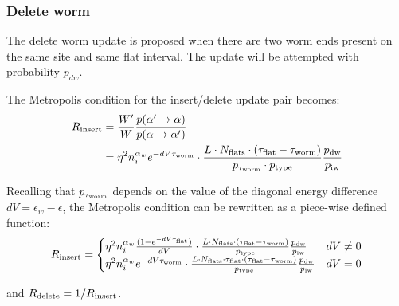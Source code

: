 \documentclass[12pt, two sided]{article}
\begin{document}
    
    \subsubsection{Delete worm}
    The delete worm update is proposed when there are two worm ends present on the same site and same flat interval. The update will be attempted with probability $p_{dw}$.
    
    The Metropolis condition for the insert/delete update pair becomes:
    \begin{align}
    R_{\rm{insert}} &= \frac{W^\prime }{W } \frac{p(\alpha^\prime \to \alpha)}{p(\alpha \to \alpha^\prime)} \nonumber \\
    &= \eta^2 n_i^{\alpha_w} e^{-dV \tau_{\rm{worm}}} \cdot \frac{L \cdot N_{\rm{flats}} \cdot (\tau_{\rm{flat}}-\tau_{\rm{worm}})}{p_{\tau_{\rm{worm}}} \cdot p_{\rm{type}}} \frac{p_{\rm{dw}}}{p_{\rm{iw}}}
    \end{align}
    
    Recalling that $p_{\tau_{\rm{worm}}}$ depends on the value of the diagonal energy difference $dV=\epsilon_{w}-\epsilon$, the Metropolis condition can be rewritten as a piece-wise defined function:
    \begin{equation}
    R_{\rm{insert}}  =
    \begin{cases}
      \eta^2 n_i^{\alpha_w} \frac{(1-e^{-dV \tau_{\rm{flat}}})}{dV} \cdot \frac{L \cdot N_{\rm{flats}} \cdot (\tau_{\rm{flat}}-\tau_{\rm{worm}})}{p_{\rm{type}}} \frac{p_{\rm{dw}}}{p_{\rm{iw}}} & dV \neq 0 \\
        \eta^2 n_i^{\alpha_w} e^{-dV \tau_{\rm{worm}}} \cdot \frac{L \cdot N_{\rm{flats}} \cdot  \tau_{\rm{flat}} \cdot (\tau_{\rm{flat}}-\tau_{\rm{worm}})}{p_{\rm{type}}} \frac{p_{\rm{dw}}}{p_{\rm{iw}}} & dV = 0 \\
    \end{cases}
    \end{equation}
    
    and $R_{\rm{delete}} = 1/R_{\rm{insert}}$.
    
\end{document}
